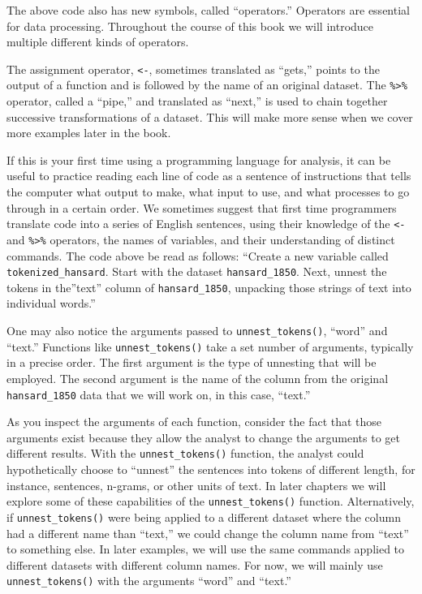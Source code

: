 \documentclass[
]{article}
\begin{document}
The above code also has new symbols, called ``operators.'' Operators are
essential for data processing. Throughout the course of this book we
will introduce multiple different kinds of operators.

The assignment operator, \texttt{\textless{}-}, sometimes translated as
``gets,'' points to the output of a function and is followed by the name
of an original dataset. The \texttt{\%\textgreater{}\%} operator, called
a ``pipe,'' and translated as ``next,'' is used to chain together
successive transformations of a dataset. This will make more sense when
we cover more examples later in the book.

If this is your first time using a programming language for analysis, it
can be useful to practice reading each line of code as a sentence of
instructions that tells the computer what output to make, what input to
use, and what processes to go through in a certain order. We sometimes
suggest that first time programmers translate code into a series of
English sentences, using their knowledge of the \texttt{\textless{}-}
and \texttt{\%\textgreater{}\%} operators, the names of variables, and
their understanding of distinct commands. The code above be read as
follows: ``Create a new variable called \texttt{tokenized\_hansard}.
Start with the dataset \texttt{hansard\_1850}. Next, unnest the tokens
in the''text'' column of \texttt{hansard\_1850}, unpacking those strings
of text into individual words.''

One may also notice the arguments passed to \texttt{unnest\_tokens()},
``word'' and ``text.'' Functions like \texttt{unnest\_tokens()} take a
set number of arguments, typically in a precise order. The first
argument is the type of unnesting that will be employed. The second
argument is the name of the column from the original
\texttt{hansard\_1850} data that we will work on, in this case,
``text.''

As you inspect the arguments of each function, consider the fact that
those arguments exist because they allow the analyst to change the
arguments to get different results. With the \texttt{unnest\_tokens()}
function, the analyst could hypothetically choose to ``unnest'' the
sentences into tokens of different length, for instance, sentences,
n-grams, or other units of text. In later chapters we will explore some
of these capabilities of the \texttt{unnest\_tokens()} function.
Alternatively, if \texttt{unnest\_tokens()} were being applied to a
different dataset where the column had a different name than ``text,''
we could change the column name from ``text'' to something else. In
later examples, we will use the same commands applied to different
datasets with different column names. For now, we will mainly use
\texttt{unnest\_tokens()} with the arguments ``word'' and ``text.''
\end{document}
